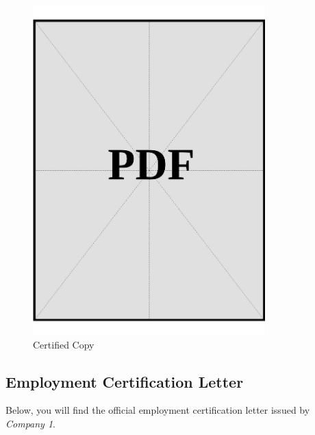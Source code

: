 \clearpage
\vspace*{\fill}

\begin{figure}[ht]
  \centering
  \includegraphics[page=1, width=0.8\textwidth]{../application-docs/applicant/employment/company-1/insurance-records/certified-copies.pdf}
  \caption{Certified Copy}
  \label{pdf:company-1-insurance-certified-copy}
\end{figure}
\vspace*{\fill}

\clearpage

\subsection*{Employment Certification Letter}\label{ssec:company-1-certificate}

Below, you will find the official employment certification letter issued by \textit{Company 1}.

